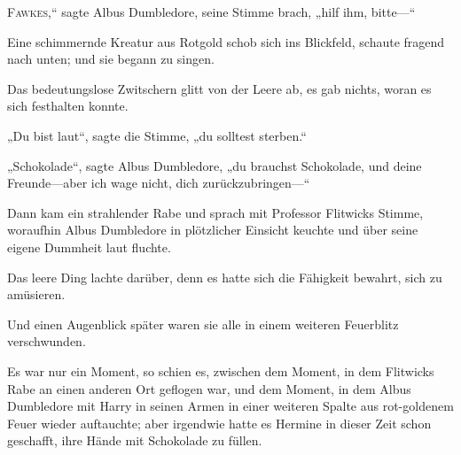 
\lettrine[ante=„]{F}{awkes},“ sagte Albus Dumbledore, seine Stimme brach, „hilf ihm, bitte—“

Eine schimmernde Kreatur aus Rotgold schob sich ins Blickfeld, schaute fragend nach unten; und sie begann zu singen.

Das bedeutungslose Zwitschern glitt von der Leere ab, es gab nichts, woran es sich festhalten konnte.

„Du bist laut“, sagte die Stimme, „du solltest sterben.“

„Schokolade“, sagte Albus Dumbledore, „du brauchst Schokolade, und deine Freunde—aber ich wage nicht, dich zurückzubringen—“

Dann kam ein strahlender Rabe und sprach mit Professor Flitwicks Stimme, woraufhin Albus Dumbledore in plötzlicher Einsicht keuchte und über seine eigene Dummheit laut fluchte.

Das leere Ding lachte darüber, denn es hatte sich die Fähigkeit bewahrt, sich zu amüsieren.

Und einen Augenblick später waren sie alle in einem weiteren Feuerblitz verschwunden.

\later

Es war nur ein Moment, so schien es, zwischen dem Moment, in dem Flitwicks Rabe an einen anderen Ort geflogen war, und dem Moment, in dem Albus Dumbledore mit Harry in seinen Armen in einer weiteren Spalte aus rot-goldenem Feuer wieder auftauchte; aber irgendwie hatte es Hermine in dieser Zeit schon geschafft, ihre Hände mit Schokolade zu füllen.

